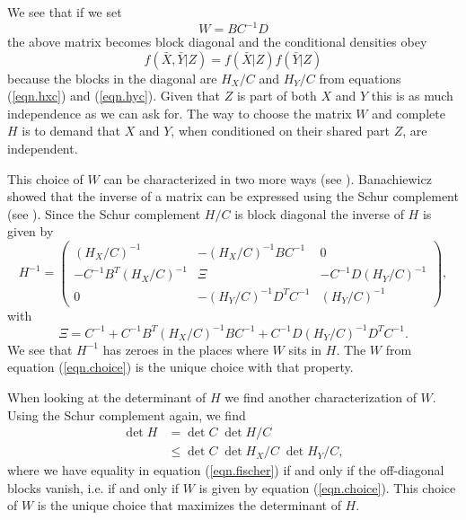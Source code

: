 \documentclass[11pt, a4paper]{article}
\begin{document}
We see that if we set
\begin{equation}\label{eqn.choice}
	W = BC^{-1}D
\end{equation}
the above matrix becomes block diagonal and the conditional densities obey
\begin{equation}\label{eqn.independent}
	f(\bar X,\bar Y\vert Z ) = f(\bar X\vert Z)f(\bar Y\vert Z)
\end{equation}
because the blocks in the diagonal are $H_X/C$ and $H_Y/C$ from equations (\ref{eqn.hxc}) and (\ref{eqn.hyc}). Given that $Z$ is part of both $X$ and $Y$ this is as much independence as we can ask for. The way to choose the matrix $W$ and complete $H$ is to demand that $X$ and $Y$, when conditioned on their shared part $Z$, are independent.

This choice of $W$ can be characterized in two more ways (see \cite{smith}). Banachiewicz showed that the inverse of a matrix can be expressed using the Schur complement (see \cite{horn}). Since the Schur complement $H/C$ is block diagonal the inverse of $H$ is given by
\begin{equation}
	H^{-1} = \begin{pmatrix}
		(H_X/C)^{-1} & -(H_X/C)^{-1} B C^{-1} & 0 \\
		- C^{-1} B^T (H_X/C)^{-1} & \Xi & - C^{-1} D (H_Y/C)^{-1} \\
		0 & - (H_Y/C)^{-1} D^T C^{-1} & (H_Y/C)^{-1} 
	\end{pmatrix},
\end{equation}
with
\begin{equation}
\Xi = C^{-1} + C^{-1} B^T (H_X/C)^{-1} B C^{-1} + C^{-1} D (H_Y/C)^{-1} D^T C^{-1}.
\end{equation}
We see that $H^{-1}$ has zeroes in the places where $W$ sits in $H$. The $W$ from equation (\ref{eqn.choice}) is the unique choice with that property.  

When looking at the determinant of $H$ we find another characterization of $W$. Using the Schur complement again, we find
\begin{align}
	\det H & = \det C \; \det H/C \\
	& \le \det C \; \det H_X/C \; \det H_Y/C,\label{eqn.fischer}
\end{align}
where we have equality in equation (\ref{eqn.fischer}) if and only if the off-diagonal blocks vanish, i.e. if and only if $W$ is given by equation (\ref{eqn.choice}). This choice of $W$ is the unique choice that maximizes the determinant of $H$.
\end{document}
